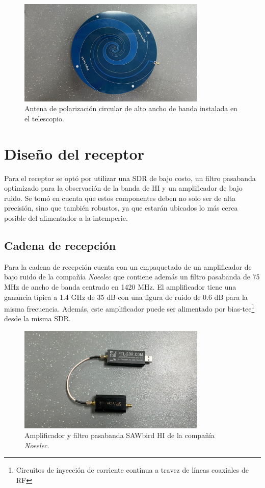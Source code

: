 \begin{figure}
    \centering
    \includegraphics[width=0.8\textwidth]{img/paletaFeed}
    \caption{Antena de polarización circular de alto ancho de banda instalada en el telescopio.}
    \label{fig:ensamble15}
\end{figure}


\section{Diseño del receptor}

Para el receptor se optó por utilizar una SDR de bajo costo, un filtro pasabanda optimizado para la observación de la banda de HI y un amplificador de bajo ruido. Se tomó en cuenta que estos componentes deben no solo ser de alta precisión, sino que también robustos, ya que estarán ubicados lo más cerca posible del alimentador a la intemperie.\\

\subsection{Cadena de recepción}

Para la cadena de recepción cuenta con un empaquetado de un amplificador de bajo ruido de la compañía \textit{Noeelec} que contiene además un filtro pasabanda de 75 MHz de ancho de banda centrado en 1420 MHz. El amplificador tiene una ganancia típica a 1.4 GHz de 35 dB con una figura de ruido de 0.6 dB para la misma frecuencia. Además, este amplificador puede ser alimentado por bias-tee\footnote{Circuitos de inyección de corriente continua a travez de líneas coaxiales de RF} desde la misma SDR.\\

\begin{figure}
    \centering
    \includegraphics[width=0.8\textwidth]{img/rtl_saw}
    \caption{Amplificador y filtro pasabanda SAWbird HI de la compañía \textit{Noeelec}.}
    \label{fig:cadena}
\end{figure}


